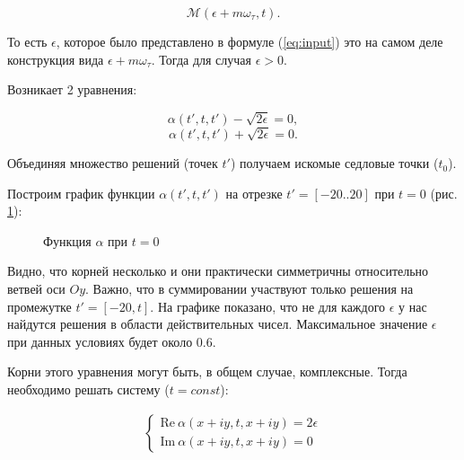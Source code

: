 \documentclass[14pt]{article}
\numberwithin{figure}{section}
\numberwithin{equation}{section}
\renewcommand{\Re}{\mathrm{Re}}
\renewcommand{\Im}{\mathrm{Im}}
\newcommand{\cM}{\mathcal{M}}
\begin{document}
$$
\cM(\epsilon+m\omega_\tau,t).
$$

То есть $\epsilon$, которое было представлено в формуле (\ref{eq:input}) это на самом деле конструкция вида $\epsilon+m\omega_\tau$. Тогда для случая $\epsilon > 0$.

Возникает 2 уравнения:

$$\alpha(t', t, t') - \sqrt{2\epsilon} = 0,$$
$$\alpha(t', t, t') + \sqrt{2\epsilon} = 0.$$

Объединяя множество решений (точек $t'$) получаем искомые седловые точки ($t_0$).

Построим график функции $\alpha(t', t, t')$ на отрезке $t' = [-20..20]$ при $t = 0$ (рис. \ref{ris:alpha-20..0}):

\begin{figure}[h]
	\caption{Функция $\alpha$ при $t = 0$}
	\label{ris:alpha-20..0}
\end{figure}

Видно, что корней несколько и они практически симметричны относительно ветвей оси $O y$. Важно, что в суммировании участвуют только решения на промежутке $t' = [-20, t]$. 
На графике показано, что не для каждого $\epsilon$ у нас найдутся решения в области действительных чисел. Максимальное значение $\epsilon$ при данных условиях будет около 0.6.

Корни этого уравнения могут быть, в общем случае, комплексные. Тогда необходимо решать систему ($t = const$):

\begin{eqnarray}
\begin{cases}
\Re \ \alpha(x+i y, t, x+i y) = 2\epsilon \nonumber\\
\Im \ \alpha(x+i y, t, x+i y) = 0 \nonumber
\end{cases}
\end{eqnarray}
\end{document}
